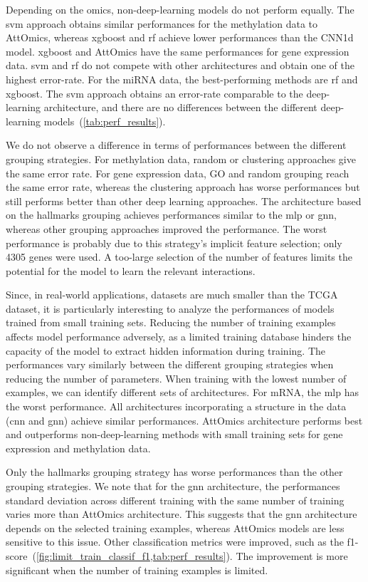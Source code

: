 \documentclass[../main.tex]{subfiles}
\begin{document}
		Depending on the omics, non-deep-learning models do not perform equally.
		The \gls{svm} approach obtains similar performances for the methylation data to AttOmics, whereas \gls{xgboost} and \gls{rf} achieve lower performances than the CNN1d model.
		\gls{xgboost} and AttOmics have the same performances for gene expression data.
		\gls{svm} and \gls{rf} do not compete with other architectures and obtain one of the highest error-rate.
		For the miRNA data, the best-performing methods are \gls{rf} and \gls{xgboost}.
		The \gls{svm} approach obtains an error-rate comparable to the deep-learning architecture, and there are no differences between the different deep-learning models~(\cref{tab:perf_results}).

		We do not observe a difference in terms of performances between the different grouping strategies.
		For methylation data, random or clustering approaches give the same error rate.
		For gene expression data, GO and random grouping reach the same error rate, whereas the clustering approach has worse performances but still performs better than other deep learning approaches.
		The architecture based on the hallmarks grouping achieves performances similar to the \gls{mlp} or \gls{gnn}, whereas other grouping approaches improved the performance.
		The worst performance is probably due to this strategy's implicit feature selection; only 4305 genes were used.
		A too-large selection of the number of features limits the potential for the model to learn the relevant interactions.

		Since, in real-world applications, datasets are much smaller than the TCGA dataset, it is particularly interesting to analyze the performances of models trained from small training sets.
		Reducing the number of training examples affects model performance adversely, as a limited training database hinders the capacity of the model to extract hidden information during training.
		The performances vary similarly between the different grouping strategies when reducing the number of parameters.
		When training with the lowest number of examples, we can identify different sets of architectures.
		For mRNA, the \gls{mlp} has the worst performance.
		All architectures incorporating a structure in the data (\gls{cnn} and \gls{gnn}) achieve similar performances.
		AttOmics architecture performs best and outperforms non-deep-learning methods with small training sets for gene expression and methylation data.

		Only the hallmarks grouping strategy has worse performances than the other grouping strategies.
		We note that for the \gls{gnn} architecture, the performances standard deviation across different training with the same number of training varies more than AttOmics architecture.
		This suggests that the \gls{gnn} architecture depends on the selected training examples, whereas AttOmics models are less sensitive to this issue.
		Other classification metrics were improved, such as the f1-score~(\cref{fig:limit_train_classif_f1,tab:perf_results}).
		The improvement is more significant when the number of training examples is limited.
\end{document}
